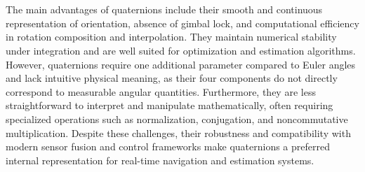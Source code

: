 \\ \\
The main advantages of quaternions include their smooth and continuous representation of orientation, absence of gimbal lock, and computational efficiency in rotation composition and interpolation. They maintain numerical stability under integration and are well suited for optimization and estimation algorithms. However, quaternions require one additional parameter compared to Euler angles and lack intuitive physical meaning, as their four components do not directly correspond to measurable angular quantities. Furthermore, they are less straightforward to interpret and manipulate mathematically, often requiring specialized operations such as normalization, conjugation, and noncommutative multiplication. Despite these challenges, their robustness and compatibility with modern sensor fusion and control frameworks make quaternions a preferred internal representation for real-time navigation and estimation systems.



